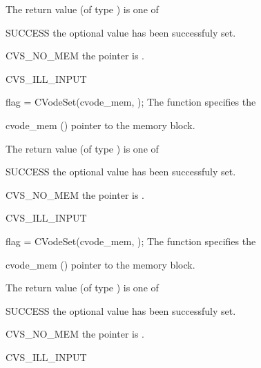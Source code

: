 {
  The return value  (of type ) is one of
  \begin{args}
  \item[SUCCESS] 
    the optional value has been successfuly set.
  \item[CVS\_NO\_MEM]
    the  pointer is .
  \item[CVS\_ILL\_INPUT]
    
  \end{args}
}
{}
{
flag = CVodeSet(cvode\_mem, );
}
{
  The function  specifies the
}
{
  \begin{args}
  \item[cvode\_mem] ()
    pointer to the {\cvodes} memory block.
  \item[]
    
  \end{args}
}
{
  The return value  (of type ) is one of
  \begin{args}
  \item[SUCCESS] 
    the optional value has been successfuly set.
  \item[CVS\_NO\_MEM]
    the  pointer is .
  \item[CVS\_ILL\_INPUT]
    
  \end{args}
}
{}
{
flag = CVodeSet(cvode\_mem, );
}
{
  The function  specifies the
}
{
  \begin{args}
  \item[cvode\_mem] ()
    pointer to the {\cvodes} memory block.
  \item[]
    
  \end{args}
}
{
  The return value  (of type ) is one of
  \begin{args}
  \item[SUCCESS] 
    the optional value has been successfuly set.
  \item[CVS\_NO\_MEM]
    the  pointer is .
  \item[CVS\_ILL\_INPUT]
    
  \end{args}
}
{}


